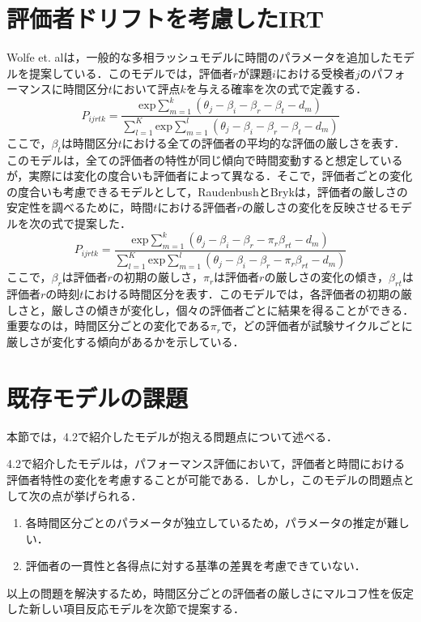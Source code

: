 \documentclass[a4paper,11pt,oneside,openany]{jsbook}
\begin{document}
\section{評価者ドリフトを考慮したIRT}

Wolfe et. al\cite{Wolfe}は，一般的な多相ラッシュモデルに時間のパラメータを追加したモデルを提案している．このモデルでは，評価者$r$が課題$i$における受検者$j$のパフォーマンスに時間区分$t$において評点$k$を与える確率を次の式で定義する．
\begin{displaymath}
P_{ijrtk}=\frac{\mathrm{exp}\sum_{m=1}^{k}(\theta_{j}-\beta_{i}-\beta_{r}-\beta_{t}-d_{m})}{\sum_{l=1}^{K}\mathrm{exp}\sum_{m=1}^{l}(\theta_{j}-\beta_{i}-\beta_{r}-\beta_{t}-d_{m})}
\end{displaymath}
ここで，$\beta_t$は時間区分$t$における全ての評価者の平均的な評価の厳しさを表す．
このモデルは，全ての評価者の特性が同じ傾向で時間変動すると想定しているが，実際には変化の度合いも評価者によって異なる．そこで，評価者ごとの変化の度合いも考慮できるモデルとして，RaudenbushとBryk\cite{Raudenbush}は，評価者の厳しさの安定性を調べるために，時間$t$における評価者$r$の厳しさの変化を反映させるモデルを次の式で提案した．
\begin{displaymath}
P_{ijrtk}=\frac{\mathrm{exp}\sum_{m=1}^{k}(\theta_{j}-\beta_{i}-\beta_{r} - \pi_{r}\beta_{rt}-d_{m})}{\sum_{l=1}^{K}\mathrm{exp}\sum_{m=1}^{l}(\theta_{j}-\beta_{i}-\beta_{r} - \pi_{r}\beta_{rt}-d_{m})}
\end{displaymath}
ここで，$\beta_{r}$は評価者$r$の初期の厳しさ，$\pi_{r}$は評価者$r$の厳しさの変化の傾き，$\beta_{rt}$は評価者$r$の時刻$t$における時間区分を表す．このモデルでは，各評価者の初期の厳しさと，厳しさの傾きが変化し，個々の評価者ごとに結果を得ることができる．重要なのは，時間区分ごとの変化である$\pi_{r}$で，どの評価者が試験サイクルごとに厳しさが変化する傾向があるかを示している．

\section{既存モデルの課題}
本節では，4.2で紹介したモデルが抱える問題点について述べる．

4.2で紹介したモデルは，パフォーマンス評価において，評価者と時間における評価者特性の変化を考慮することが可能である．しかし，このモデルの問題点として次の点が挙げられる．
\begin{enumerate}
  \item 各時間区分ごとのパラメータが独立しているため，パラメータの推定が難しい．
  \item 評価者の一貫性と各得点に対する基準の差異を考慮できていない．
\end{enumerate}  
以上の問題を解決するため，時間区分ごとの評価者の厳しさにマルコフ性を仮定した新しい項目反応モデルを次節で提案する．
\newpage
\end{document}

